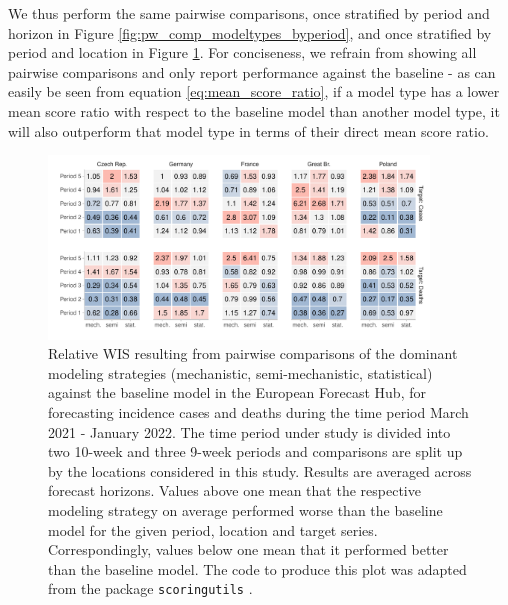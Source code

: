 We thus perform the same pairwise comparisons, once stratified by period and horizon in Figure \ref{fig:pw_comp_modeltypes_byperiod}, and once stratified by period and location in Figure \ref{fig:pw_comp_modeltypes_byloc}. For conciseness, we refrain from showing all pairwise comparisons and only report performance against the baseline - as can easily be seen from equation \ref{eq:mean_score_ratio}, if a model type has a lower mean score ratio with respect to the baseline model than another model type, it will also outperform that model type in terms of their direct mean score ratio.
\begin{figure}
\centering
\includegraphics[width = 0.9\textwidth]{../plots/pw_comp_model_types_across_periods_and_loc_wide.pdf}
\caption{Relative WIS resulting from pairwise comparisons of the dominant modeling strategies (mechanistic, semi-mechanistic, statistical) against the baseline model in the European Forecast Hub, for forecasting incidence cases and deaths during the time period March 2021 - January 2022. The time period under study is divided into two 10-week and three 9-week periods and comparisons are split up by the locations considered in this study. Results are averaged across forecast horizons. Values above one mean that the respective modeling strategy on average performed worse than the baseline model for the given period, location and target series. Correspondingly, values below one mean that it performed better than the baseline model.  The code to produce this plot was adapted from the package \texttt{scoringutils} \citep{bosse_evaluating_2022}.}
\label{fig:pw_comp_modeltypes_byloc}
\end{figure}\medskip\\
